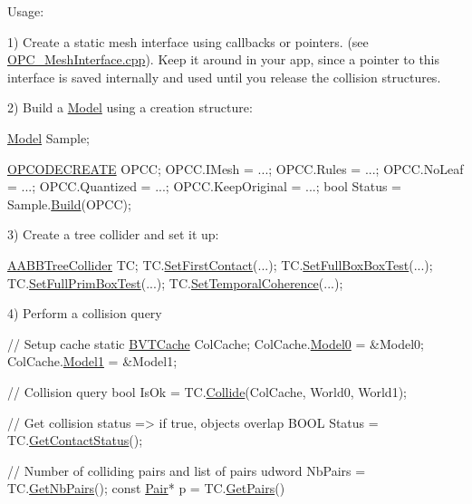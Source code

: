 Usage\+:

1) Create a static mesh interface using callbacks or pointers. (see \hyperlink{_o_p_c___mesh_interface_8cpp}{O\+P\+C\+\_\+\+Mesh\+Interface.\+cpp}). Keep it around in your app, since a pointer to this interface is saved internally and used until you release the collision structures.

2) Build a \hyperlink{class_model}{Model} using a creation structure\+:


\begin{DoxyCode}
\hyperlink{class_model}{Model} Sample;

\hyperlink{struct_o_p_c_o_d_e_c_r_e_a_t_e}{OPCODECREATE} OPCC;
OPCC.IMesh          = ...;
OPCC.Rules          = ...;
OPCC.NoLeaf         = ...;
OPCC.Quantized      = ...;
OPCC.KeepOriginal   = ...;
\textcolor{keywordtype}{bool} Status = Sample.\hyperlink{class_base_model_ab2692ac2ec9c0c8c452d73f3a0bd341b}{Build}(OPCC);
\end{DoxyCode}


3) Create a tree collider and set it up\+:


\begin{DoxyCode}
\hyperlink{class_a_a_b_b_tree_collider}{AABBTreeCollider} TC;
TC.\hyperlink{class_collider_a106bfa35e6d203dfdb27a291b9fab01a}{SetFirstContact}(...);
TC.\hyperlink{class_a_a_b_b_tree_collider_af9ae98fa5e9b721069a0dd4122754deb}{SetFullBoxBoxTest}(...);
TC.\hyperlink{class_a_a_b_b_tree_collider_a26592df7a68bee37634b96381b484b13}{SetFullPrimBoxTest}(...);
TC.\hyperlink{class_collider_a66fdf6157bf0159578723f3ed66f6e3f}{SetTemporalCoherence}(...);
\end{DoxyCode}


4) Perform a collision query


\begin{DoxyCode}
\textcolor{comment}{// Setup cache}
\textcolor{keyword}{static} \hyperlink{struct_b_v_t_cache}{BVTCache} ColCache;
ColCache.\hyperlink{struct_b_v_t_cache_a69f8d5a7613435e6c58a6816ecd15e0a}{Model0} = &Model0;
ColCache.\hyperlink{struct_b_v_t_cache_a092159126dbd147d9488f881e675fea0}{Model1} = &Model1;

\textcolor{comment}{// Collision query}
\textcolor{keywordtype}{bool} IsOk = TC.\hyperlink{class_a_a_b_b_tree_collider_a2e7e3213e9d863cc88c10efc808708ba}{Collide}(ColCache, World0, World1);

\textcolor{comment}{// Get collision status => if true, objects overlap}
BOOL Status = TC.\hyperlink{class_collider_a64a73882d4f167a6175658f014868f66}{GetContactStatus}();

\textcolor{comment}{// Number of colliding pairs and list of pairs}
udword NbPairs = TC.\hyperlink{class_a_a_b_b_tree_collider_a8b070ba9da290af5bbc187298870f00b}{GetNbPairs}();
\textcolor{keyword}{const} \hyperlink{struct_pair}{Pair}* p = TC.\hyperlink{class_a_a_b_b_tree_collider_a1a65b30029d7d0b3e9a4dfe204b3e660}{GetPairs}()
\end{DoxyCode}


